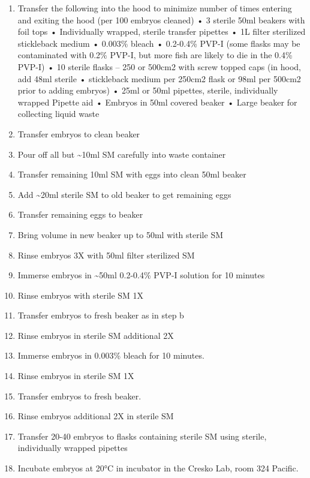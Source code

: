 \documentclass[
  letterpaper,
  DIV=11,
  numbers=noendperiod]{scrreprt}
\providecommand{\tightlist}{%
  \setlength{\itemsep}{0pt}\setlength{\parskip}{0pt}}\usepackage{longtable,booktabs,array}
\begin{document}
\begin{enumerate}
\def\labelenumi{\arabic{enumi}.}
\setcounter{enumi}{3}
\tightlist
\item
  Transfer the following into the hood to minimize number of times
  entering and exiting the hood (per 100 embryos cleaned) • 3 sterile
  50ml beakers with foil tops • Individually wrapped, sterile transfer
  pipettes • 1L filter sterilized stickleback medium • 0.003\% bleach •
  0.2-0.4\% PVP-I (some flasks may be contaminated with 0.2\% PVP-I, but
  more fish are likely to die in the 0.4\% PVP-I) • 10 sterile flasks --
  250 or 500cm2 with screw topped caps (in hood, add 48ml sterile •
  stickleback medium per 250cm2 flask or 98ml per 500cm2 prior to adding
  embryos) • 25ml or 50ml pipettes, sterile, individually wrapped
  Pipette aid • Embryos in 50ml covered beaker • Large beaker for
  collecting liquid waste
\item
  Transfer embryos to clean beaker
\item
  Pour off all but \textasciitilde10ml SM carefully into waste container
\item
  Transfer remaining 10ml SM with eggs into clean 50ml beaker
\item
  Add \textasciitilde20ml sterile SM to old beaker to get remaining eggs
\item
  Transfer remaining eggs to beaker
\item
  Bring volume in new beaker up to 50ml with sterile SM
\item
  Rinse embryos 3X with 50ml filter sterilized SM
\item
  Immerse embryos in \textasciitilde50ml 0.2-0.4\% PVP-I solution for 10
  minutes
\item
  Rinse embryos with sterile SM 1X
\item
  Transfer embryos to fresh beaker as in step b
\item
  Rinse embryos in sterile SM additional 2X
\item
  Immerse embryos in 0.003\% bleach for 10 minutes.
\item
  Rinse embryos in sterile SM 1X
\item
  Transfer embryos to fresh beaker.
\item
  Rinse embryos additional 2X in sterile SM
\item
  Transfer 20-40 embryos to flasks containing sterile SM using sterile,
  individually wrapped pipettes
\item
  Incubate embryos at 20°C in incubator in the Cresko Lab, room 324
  Pacific.
\end{enumerate}
\end{document}
